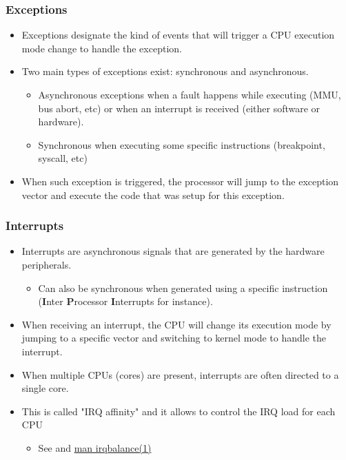 \begin{frame}
  \frametitle{Exceptions}
  \begin{itemize}
    \item Exceptions designate the kind of events that will trigger a CPU
          execution mode change to handle the exception.
    \item Two main types of exceptions exist: synchronous and asynchronous.
    \begin{itemize}
      \item Asynchronous exceptions when a fault happens while executing (MMU,
            bus abort, etc) or when an interrupt is received (either software
            or hardware).
      \item Synchronous when executing some specific instructions (breakpoint,
            syscall, etc)
    \end{itemize}
    \item When such exception is triggered, the processor will jump to the
          exception vector and execute the code that was setup for this
          exception.
  \end{itemize}
\end{frame}

\begin{frame}
  \frametitle{Interrupts}
  \begin{itemize}
    \item Interrupts are asynchronous signals that are generated by the hardware
          peripherals.
    \begin{itemize}
      \item Can also be synchronous when generated using a specific instruction
            ({\bf I}nter {\bf P}rocessor {\bf I}nterrupts for instance).
    \end{itemize}
    \item When receiving an interrupt, the CPU will change its execution mode by
          jumping to a specific vector and switching to kernel mode to handle the
          interrupt.
    \item When multiple CPUs (cores) are present, interrupts are often directed
          to a single core.
    \item This is called "IRQ affinity" and it allows to control the IRQ load for
          each CPU
    \begin{itemize}
      \item See  and
            \href{https://linux.die.net/man/1/irqbalance}{man irqbalance(1)}
    \end{itemize}
  \end{itemize}
\end{frame}

